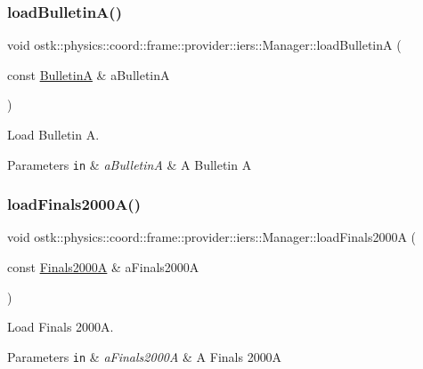 \subsubsection{\texorpdfstring{load\+Bulletin\+A()}{loadBulletinA()}}
{\footnotesize\ttfamily void ostk\+::physics\+::coord\+::frame\+::provider\+::iers\+::\+Manager\+::load\+BulletinA (\begin{DoxyParamCaption}\item[{const \hyperlink{classostk_1_1physics_1_1coord_1_1frame_1_1provider_1_1iers_1_1_bulletin_a}{BulletinA} \&}]{a\+BulletinA }\end{DoxyParamCaption})}



Load Bulletin A. 


\begin{DoxyParams}[1]{Parameters}
\mbox{\tt in}  & {\em a\+BulletinA} & A Bulletin A \\
\hline
\end{DoxyParams}
\mbox{\label{classostk_1_1physics_1_1coord_1_1frame_1_1provider_1_1iers_1_1_manager_ad79ddb22cfd125d810840611c24a9f42}} 
\subsubsection{\texorpdfstring{load\+Finals2000\+A()}{loadFinals2000A()}}
{\footnotesize\ttfamily void ostk\+::physics\+::coord\+::frame\+::provider\+::iers\+::\+Manager\+::load\+Finals2000A (\begin{DoxyParamCaption}\item[{const \hyperlink{classostk_1_1physics_1_1coord_1_1frame_1_1provider_1_1iers_1_1_finals2000_a}{Finals2000A} \&}]{a\+Finals2000A }\end{DoxyParamCaption})}



Load Finals 2000A. 


\begin{DoxyParams}[1]{Parameters}
\mbox{\tt in}  & {\em a\+Finals2000A} & A Finals 2000A \\
\hline
\end{DoxyParams}
\mbox{\label{classostk_1_1physics_1_1coord_1_1frame_1_1provider_1_1iers_1_1_manager_ab43eacd0e4e55398731f1d1294c874bc}} 
